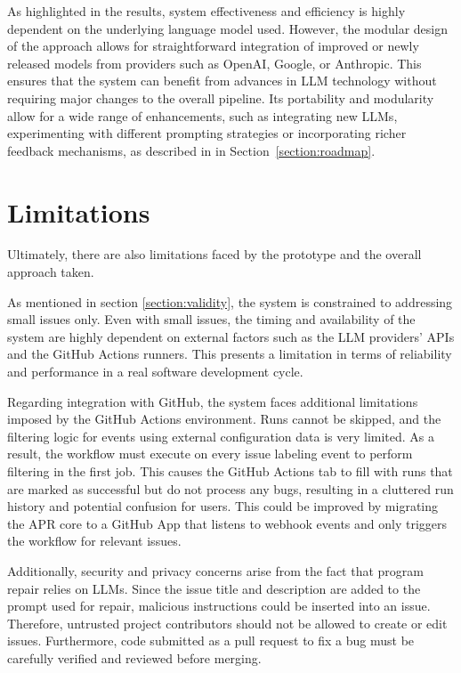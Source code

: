 As highlighted in the results, system effectiveness and efficiency is highly dependent on the underlying language model used. However, the modular design of the approach allows for straightforward integration of improved or newly released models from providers such as OpenAI, Google, or Anthropic. This ensures that the system can benefit from advances in LLM technology without requiring major changes to the overall pipeline. Its portability and modularity allow for a wide range of enhancements, such as integrating new LLMs, experimenting with different prompting strategies or incorporating richer feedback mechanisms, as described in in Section~\ref{section:roadmap}.

\section{Limitations}
Ultimately, there are also limitations faced by the prototype and the overall approach taken.

As mentioned in section \ref{section:validity}, the system is constrained to addressing small issues only. Even with small issues, the timing and availability of the system are highly dependent on external factors such as the LLM providers' APIs and the GitHub Actions runners. This presents a limitation in terms of reliability and performance in a real software development cycle.

Regarding integration with GitHub, the system faces additional limitations imposed by the GitHub Actions environment. Runs cannot be skipped, and the filtering logic for events using external configuration data is very limited. As a result, the workflow must execute on every issue labeling event to perform filtering in the first job. This causes the GitHub Actions tab to fill with runs that are marked as successful but do not process any bugs, resulting in a cluttered run history and potential confusion for users. This could be improved by migrating the APR core to a GitHub App that listens to webhook events and only triggers the workflow for relevant issues.

Additionally, security and privacy concerns arise from the fact that program repair relies on LLMs. Since the issue title and description are added to the prompt used for repair, malicious instructions could be inserted into an issue. Therefore, untrusted project contributors should not be allowed to create or edit issues. Furthermore, code submitted as a pull request to fix a bug must be carefully verified and reviewed before merging.

